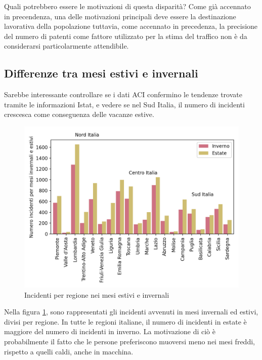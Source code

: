 \documentclass[a4paper,12pt]{report}
\begin{document}
Quali potrebbero essere le motivazioni di questa disparità?
Come già accennato in precendenza, una delle motivazioni principali 
deve essere la destinazione lavorativa della popolazione tuttavia, 
come accennato in precedenza, 
la precisione del numero di patenti come fattore utilizzato per la stima 
del traffico non è da considerarsi particolarmente attendibile.

\subsection{Differenze tra mesi estivi e invernali}

Sarebbe interessante controllare se i dati ACI confermino le tendenze trovate tramite 
le informazioni Istat, e vedere se nel Sud Italia, il numero di incidenti crescesca 
come conseguenza delle vacanze estive.

\begin{figure}
    \includegraphics[width=\linewidth]{../src/incidenti/incidenti_aci/mappe_regioni/estate_inverno.png}
    \caption{Incidenti per regione nei mesi estivi e invernali}
    \label{fig:estate-inverno}
\end{figure}

Nella figura \ref{fig:estate-inverno}, sono rappresentati gli incidenti avvenuti 
in mesi invernali ed estivi, divisi per regione. 
In tutte le regioni italiane, il numero di incidenti in estate è maggiore del 
numero di incidenti in inverno. 
La motivazione di ciò è probabilmente il fatto che 
le persone preferiscono muoversi meno nei mesi freddi, rispetto a quelli caldi, 
anche in macchina.
\end{document}
